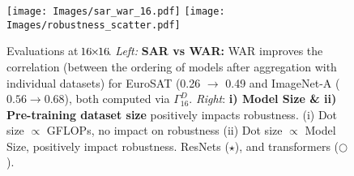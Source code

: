 \begin{figure}[!t]
\centering
\subfloat
{
\texttt{[image: Images/sar\_war\_16.pdf]} 
}
\hfill
\subfloat
{
\texttt{[image: Images/robustness\_scatter.pdf]}
}
\vspace{-3pt}
\caption{ 
Evaluations at $\!16\!\!\times\!\!16\!$. \textit{Left:} 
\textbf{SAR vs WAR:}
WAR improves the correlation (between the ordering of models after aggregation with individual datasets) for EuroSAT (0.26 $\rightarrow$ 0.49 and ImageNet-A ($0.56\rightarrow 0.68$), both computed via $\Gamma^{D}_{16}$.
\textit{Right}:
\textbf{i) Model Size \& ii) Pre-training dataset size} positively impacts robustness.
(i) Dot size $\propto$ GFLOPs, no impact on robustness (ii) Dot size $\propto$ Model Size, positively impact robustness. 
ResNets ($\star$), and transformers ($\bigcirc$).
}
\label{fig:robustness_metrics}
\label{fig:model_arch}
\label{fig:model_arch2}
\vspace{-7pt}
\end{figure}













